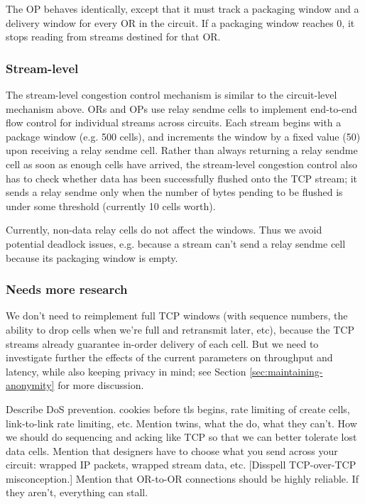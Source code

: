 \documentclass[times,10pt,twocolumn]{article}
\begin{document}
The OP behaves identically, except that it must track a packaging window
and a delivery window for every OR in the circuit. If a packaging window
reaches 0, it stops reading from streams destined for that OR.

\subsubsection{Stream-level}

The stream-level congestion control mechanism is similar to the
circuit-level mechanism above. ORs and OPs use relay sendme cells
to implement end-to-end flow control for individual streams across
circuits. Each stream begins with a package window (e.g. 500 cells),
and increments the window by a fixed value (50) upon receiving a relay
sendme cell. Rather than always returning a relay sendme cell as soon
as enough cells have arrived, the stream-level congestion control also
has to check whether data has been successfully flushed onto the TCP
stream; it sends a relay sendme only when the number of bytes pending
to be flushed is under some threshold (currently 10 cells worth).

Currently, non-data relay cells do not affect the windows. Thus we
avoid potential deadlock issues, e.g. because a stream can't send a
relay sendme cell because its packaging window is empty.

\subsubsection{Needs more research}

We don't need to reimplement full TCP windows (with sequence numbers,
the ability to drop cells when we're full and retransmit later, etc),
because the TCP streams already guarantee in-order delivery of each
cell. But we need to investigate further the effects of the current
parameters on throughput and latency, while also keeping privacy in mind;
see Section \ref{sec:maintaining-anonymity} for more discussion.


\label{subsec:dos}

Describe DoS prevention. cookies before tls begins, rate limiting of
create cells, link-to-link rate limiting, etc.
Mention twins, what the do, what they can't.
How we should do sequencing and acking like TCP so that we can better
tolerate lost data cells.
Mention that designers have to choose what you send across your
  circuit: wrapped IP packets, wrapped stream data, etc.  [Disspell
  TCP-over-TCP misconception.]
Mention that OR-to-OR connections should be highly reliable.  If
  they aren't, everything can stall.
\end{document}

